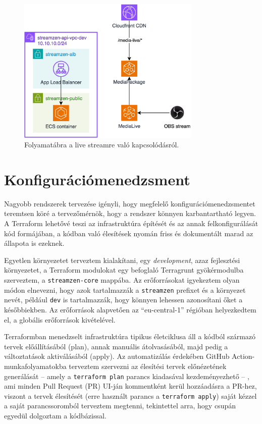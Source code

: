 \begin{figure}[h]
	\centering
	\includegraphics[height=70mm, keepaspectratio]{figures/dipterv_live2.png}
	\caption{Folyamatábra a live streamre való kapcsolódásról.}
	\label{fig:live2}
\end{figure}

\section{Konfigurációmenedzsment}\label{sec:config}

Nagyobb rendszerek tervezése igényli, hogy megfelelő konfigurációmenedzsmentet teremtsen köré a tervezőmérnök, hogy a rendszer könnyen karbantartható legyen. A Terraform lehetővé teszi az infrastruktúra építését és az annak felkonfigurálását kód formájában, a kódban való élesítések nyomán friss és dokumentált marad az állapota is ezeknek.

Egyetlen környezetet terveztem kialakítani, egy \emph{development}, azaz fejlesztési környezetet, a Terraform modulokat egy befoglaló Terragrunt gyökérmodulba szerveztem, a \verb|streamzen-core| mappába. Az erőforrásokat igyekeztem olyan módon elnevezni, hogy azok tartalmazzák a \verb|streamzen| prefixet és a környezet nevét, például \verb|dev| is tartalmazzák, hogy könnyen lehessen azonosítani őket a későbbiekben. Az erőforrások alapvetően az ``eu-central-1'' régióban helyezkedtem el, a globális erőforrások kivételével.

Terraformban menedzselt infrastruktúra tipikus életciklusa áll a kódból származó tervek előállításából (plan), annak manuális átolvasásából, majd pedig a változtatások aktiválásából (apply). Az automatizálás érdekében GitHub Action-munkafolyamatokba terveztem szervezni az élesítési tervek előnézetének generálását -- amely a \verb|terraform plan| parancs kiadasával kezdeményezhető -- , ami minden Pull Request (PR) UI-ján kommentként kerül hozzáadásra a PR-hez, viszont a tervek élesítését (erre használt parancs a \verb|terraform apply|) saját kézzel a saját parancssoromból terveztem megtenni, tekintettel arra, hogy csupán egyedül dolgoztam a kódbázissal.

